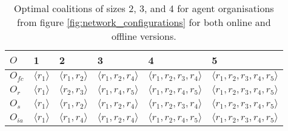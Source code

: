 \documentclass{llncs}
\newcommand{\LD}{\langle}
\newcommand{\RD}{\rangle}
\begin{document}
\begin{table}
 \centering
 \begin{tabular}{ | l | l | l | l | l | l |}
    \hline
    $O$ & 1& 2 & 3 & 4 & 5 \\ \hline
    $O_{fc}$ & $\LD r_1 \RD$ & $\LD r_1, r_2 \RD$ & $\LD r_1, r_2, r_4 \RD$ & $\LD r_1, r_2, r_3, r_4 \RD$  & $\LD r_1, r_2, r_3, r_4, r_5 \RD$ \\ \hline
    $O_r$ & $\LD r_1 \RD$  & $\LD r_2, r_3 \RD$ & $\LD r_1, r_4, r_5 \RD$ & $\LD r_1, r_2, r_4, r_5 \RD$  & $\LD r_1, r_2, r_3, r_4, r_5 \RD$\\ \hline
    $O_s$ & $\LD r_1 \RD$  & $\LD r_1, r_2 \RD$ & $\LD r_1, r_2, r_4 \RD$ & $\LD r_1, r_2, r_3, r_4 \RD$  & $\LD r_1, r_2, r_3, r_4, r_5 \RD$\\ \hline
    $O_{ia}$ & $\LD r_1 \RD$  & $\LD r_1, r_4 \RD$ & $\LD r_1, r_2, r_4 \RD$ & $\LD r_1, r_2, r_4, r_5 \RD$  & $\LD r_1, r_2, r_3, r_4, r_5 \RD$\\ \hline
\end{tabular}
\caption{Optimal coalitions of sizes 2, 3, and 4 for agent organisations from figure \ref{fig:network_configurations} for both online and offline versions.}
\label{tab:optimal_coalitions}
\end{table}

\begin{table}
 \centering
{}
\caption{Values for maximum probabilities to complete one task for coalitions from table \ref{tab:optimal_coalitions}.}
\end{table}
\end{document}
